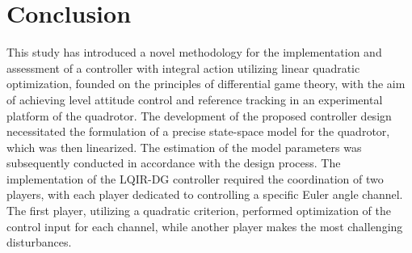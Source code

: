 \documentclass[3p,times]{elsarticle}
\begin{document}
\section{Conclusion}\label{sec:conclusion}

\noindent This study has introduced a novel methodology for the implementation and assessment of a controller with integral action utilizing linear quadratic optimization, founded on the principles of differential game theory, with the aim of achieving level attitude control and reference tracking in an experimental platform of the quadrotor.
The development of the proposed controller design necessitated the formulation of a precise state-space model for the quadrotor, which was then linearized. The estimation of the model parameters was subsequently conducted in accordance with the design process.
The implementation of the LQIR-DG controller required the coordination of two players, with each player dedicated to controlling a specific Euler angle channel.
The first player, utilizing a quadratic criterion, performed optimization of the control input for each channel, while another player makes the most challenging disturbances.
\end{document}
